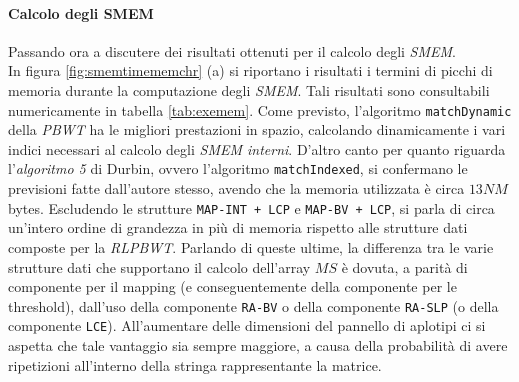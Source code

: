 \paragraph{Calcolo degli SMEM}
Passando ora a discutere dei risultati ottenuti per il calcolo degli
\textit{SMEM}.\\ 
In figura \ref{fig:smemtimememchr} (a) si riportano i risultati i termini di
picchi di 
memoria durante la computazione degli \textit{SMEM}. Tali risultati sono
consultabili numericamente in tabella \ref{tab:exemem}. Come previsto,
l'algoritmo 
\texttt{matchDynamic} della \textit{PBWT} ha le migliori prestazioni
in spazio, calcolando dinamicamente i vari indici necessari al calcolo degli
\textit{SMEM interni}. D'altro canto per quanto riguarda l'\textit{algoritmo 5}
di Durbin, ovvero l'algoritmo \texttt{matchIndexed}, si confermano le previsioni
fatte dall'autore stesso, avendo che la memoria utilizzata è circa $13NM$
bytes. Escludendo le strutture \texttt{MAP-INT + LCP} e \texttt{MAP-BV + LCP},
si parla di circa un'intero ordine di grandezza in più di memoria rispetto alle
strutture dati composte per la \textit{RLPBWT}. Parlando di queste ultime, la
differenza tra le varie strutture dati che supportano il calcolo 
dell'array $MS$ è dovuta, a parità di componente per il mapping (e
conseguentemente della componente per le threshold), dall'uso della componente
\texttt{RA-BV} o della componente \texttt{RA-SLP} (o della componente
\texttt{LCE}). All'aumentare delle dimensioni del pannello di aplotipi ci si
aspetta che tale vantaggio sia sempre maggiore, a causa della probabilità di
avere ripetizioni all'interno della stringa rappresentante la matrice.\\
